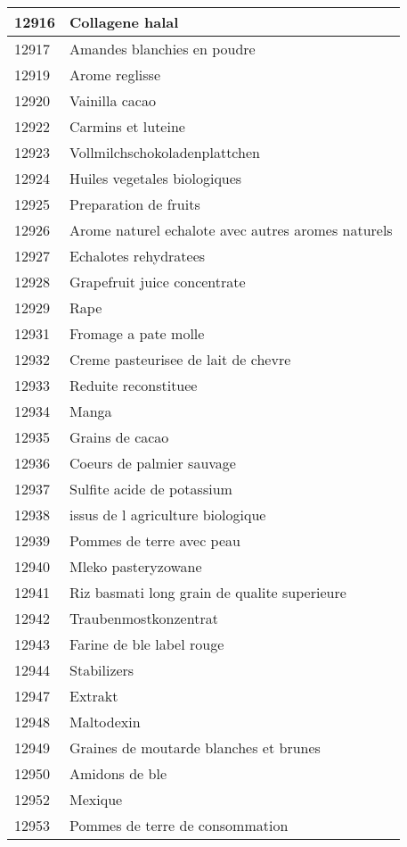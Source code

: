\begin{longtable}{|l|l|}
12916 & Collagene halal \\ \hline 
12917 & Amandes blanchies en poudre \\ \hline 
12919 & Arome reglisse \\ \hline 
12920 & Vainilla cacao \\ \hline 
12922 & Carmins et luteine \\ \hline 
12923 & Vollmilchschokoladenplattchen \\ \hline 
12924 & Huiles vegetales biologiques \\ \hline 
12925 & Preparation de fruits \\ \hline 
12926 & Arome naturel echalote avec autres aromes naturels \\ \hline 
12927 & Echalotes rehydratees \\ \hline 
12928 & Grapefruit juice concentrate \\ \hline 
12929 & Rape \\ \hline 
12931 & Fromage a pate molle \\ \hline 
12932 & Creme pasteurisee de lait de chevre \\ \hline 
12933 & Reduite reconstituee \\ \hline 
12934 & Manga \\ \hline 
12935 & Grains de cacao \\ \hline 
12936 & Coeurs de palmier sauvage \\ \hline 
12937 & Sulfite acide de potassium \\ \hline 
12938 &  issus de l agriculture biologique \\ \hline 
12939 & Pommes de terre avec peau \\ \hline 
12940 & Mleko pasteryzowane \\ \hline 
12941 & Riz basmati long grain de qualite superieure \\ \hline 
12942 & Traubenmostkonzentrat \\ \hline 
12943 & Farine de ble label rouge \\ \hline 
12944 & Stabilizers \\ \hline 
12947 & Extrakt \\ \hline 
12948 & Maltodexin \\ \hline 
12949 & Graines de moutarde blanches et brunes \\ \hline 
12950 & Amidons de ble \\ \hline 
12952 & Mexique \\ \hline 
12953 & Pommes de terre de consommation \\ \hline 

\end{longtable}
